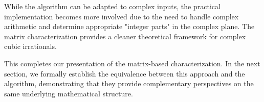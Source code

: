 \begin{remark}
While the \HAPD{} algorithm can be adapted to complex inputs, the practical implementation becomes more involved due to the need to handle complex arithmetic and determine appropriate "integer parts" in the complex plane. The matrix characterization provides a cleaner theoretical framework for complex cubic irrationals.
\end{remark}

This completes our presentation of the matrix-based characterization. In the next section, we formally establish the equivalence between this approach and the \HAPD{} algorithm, demonstrating that they provide complementary perspectives on the same underlying mathematical structure.
